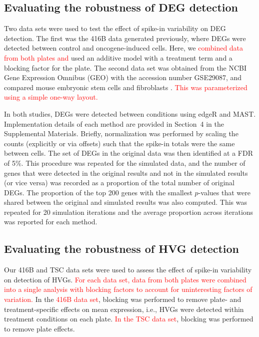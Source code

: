 \documentclass{article}
\newcommand{\suppsecsim}{4}
\newcommand{\revised}[1]{\textcolor{red}{#1}}
\begin{document}

\subsection*{Evaluating the robustness of DEG detection}
Two data sets were used to test the effect of spike-in variability on DEG detection.
The first was the 416B data generated previously, where DEGs were detected between control and oncogene-induced cells.
Here, we \revised{combined data from both plates and} used an additive model with a treatment term and a blocking factor for the plate.
The second data set was obtained from the NCBI Gene Expression Omnibus (GEO) with the accession number GSE29087, and compared mouse embryonic stem cells and fibroblasts \autocite{islam2011characterization}.
\revised{This was parameterized using a simple one-way layout.}

In both studies, DEGs were detected between conditions using edgeR and MAST.
Implementation details of each method are provided in Section~\suppsecsim{} in the Supplemental Materials. 
Briefly, normalization was performed by scaling the counts (explicitly or via offsets) such that the spike-in totals were the same between cells.
The set of DEGs in the original data was then identified at a FDR of 5\%.
This procedure was repeated for the simulated data, and the number of genes that were detected in the original results and not in the simulated results (or vice versa) was recorded as a proportion of the total number of original DEGs.
The proportion of the top 200 genes with the smallest $p$-values that were shared between the original and simulated results was also computed.
This was repeated for 20 simulation iterations and the average proportion across iterations was reported for each method.

\subsection*{Evaluating the robustness of HVG detection}
Our 416B and TSC data sets were used to assess the effect of spike-in variability on detection of HVGs.
\revised{For each data set, data from both plates were combined into a single analysis with blocking factors to account for uninteresting factors of variation.}
In the \revised{416B data set}, blocking was performed to remove plate- and treatment-specific effects on mean expression, i.e., HVGs were detected within treatment conditions on each plate.
\revised{In the TSC data set}, blocking was performed to remove plate effects.
\end{document}

